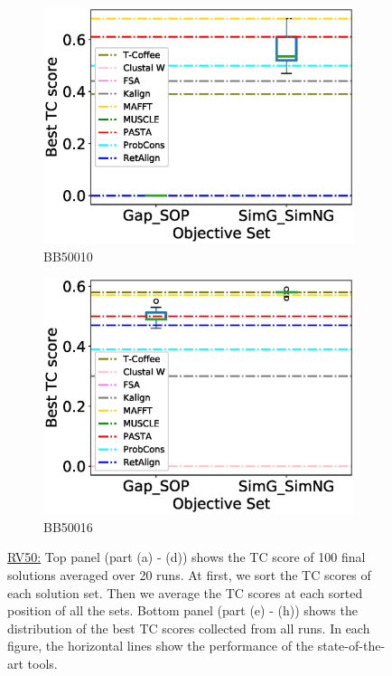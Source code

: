 \begin{figure}[!htbp]
\begin{adjustwidth}{-1.5cm}{-1cm}
\begin{subfigure}{0.22\textwidth}
			\includegraphics[width=\columnwidth]{Figure/summary/precomputedInit/Balibase/BB50010_objset_tc_rank_2}
			\caption{BB50010}
		\end{subfigure}
		\begin{subfigure}{0.22\textwidth}
			\includegraphics[width=\columnwidth]{Figure/summary/precomputedInit/Balibase/BB50016_objset_tc_rank_2}
			\caption{BB50016}
		\end{subfigure}
		\end{adjustwidth}
		\caption[TC score results on RV50]{\underline{RV50:} Top panel (part (a) - (d)) shows the TC score of 100 final solutions averaged over 20 runs. At first, we sort the TC scores of each solution set. Then we average the TC scores at each sorted position of all the sets. Bottom panel (part (e) - (h)) shows the distribution of the best TC scores collected from all runs. In each figure, the horizontal lines show the performance of the state-of-the-art tools.}
		\label{fig:rv50_tc}

\end{figure}


